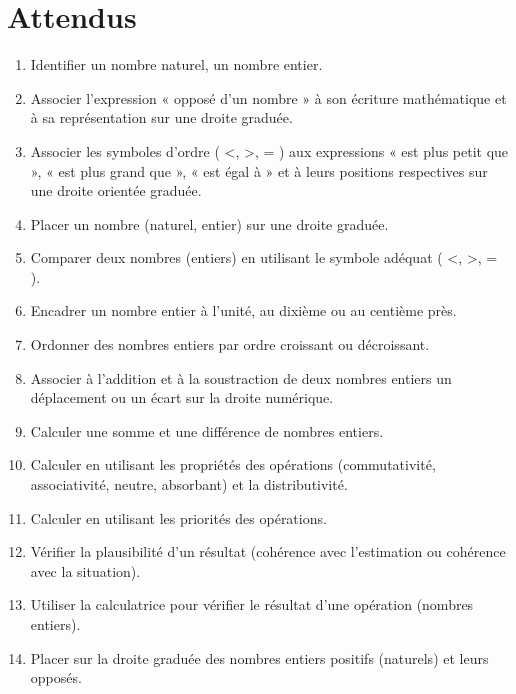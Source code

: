 \documentclass[../../syllabus_1.tex]{subfiles}
\begin{document}
\section*{Attendus}
\begin{enumerate}[label=\textbf{\arabic*.}]
    \item Identifier un nombre naturel, un nombre entier.
    \item Associer l'expression « opposé d'un nombre » à son écriture mathématique et à sa représentation sur une droite graduée.
    \item Associer les symboles d'ordre ( <, >, = ) aux expressions « est plus petit que », « est plus grand que », « est égal à » et à leurs positions respectives sur une droite orientée graduée.
    \item Placer un nombre (naturel, entier) sur une droite graduée.
    \item Comparer deux nombres (entiers) en utilisant le symbole adéquat ( <, >, = ).
    \item Encadrer un nombre entier à l'unité, au dixième ou au centième près.
    \item Ordonner des nombres entiers par ordre croissant ou décroissant.
    \item Associer à l'addition et à la soustraction de deux nombres entiers un déplacement ou un écart sur la droite numérique.
    \item Calculer une somme et une différence de nombres entiers.
    \item Calculer en utilisant les propriétés des opérations (commutativité, associativité, neutre, absorbant) et la distributivité.
    \item Calculer en utilisant les priorités des opérations.
    \item Vérifier la plausibilité d'un résultat (cohérence avec l'estimation ou cohérence avec la situation).
    \item Utiliser la calculatrice pour vérifier le résultat d'une opération (nombres entiers).
    \item Placer sur la droite graduée des nombres entiers positifs (naturels) et leurs opposés.
\end{enumerate}
\end{document}
